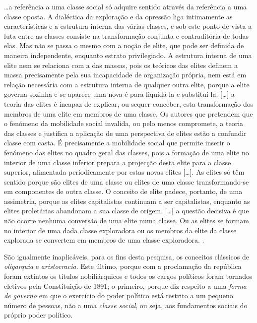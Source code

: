 \begin{citacao}
\dots a referência a uma classe social só adquire sentido através da referência a uma classe oposta. A dialéctica da exploração e da opressão liga intimamente as características e a estrutura interna das várias classes, e sob este ponto de vista a luta entre as classes consiste na transformação conjunta e contraditória de todas elas. Mas não se passa o mesmo com a noção de elite, que pode ser definida de maneira independente, enquanto estrato privilegiado. A estrutura interna de uma elite nem se relaciona com a das massas, pois os teóricos das elites definem a massa precisamente pela sua incapacidade de organização própria, nem está em relação necessária com a estrutura interna de qualquer outra elite, porque a elite governa sozinha e se aparece uma nova é para liquidá-la e substituí-la. [\dots] a teoria das elites é incapaz de explicar, ou sequer conceber, esta transformação dos membros de uma elite em membros de uma classe. Os autores que pretendem que o fenómeno da mobilidade social invalida, ou pelo menos compromete, a teoria das classes e justifica a aplicação de uma perspectiva de elites estão a confundir classe com casta. É precisamente a mobilidade social que permite inserir o fenómeno das elites no quadro geral das classes, pois a formação de uma elite no interior de uma classe inferior prepara a projecção desta elite para a classe superior, alimentada periodicamente por estas novas elites [\dots]. As elites só têm sentido porque são elites de uma classe ou elites de uma classe transformando-se em componentes de outra classe. O conceito de elite padece, portanto, de uma assimetria, porque as elites capitalistas continuam a ser capitalistas, enquanto as elites proletárias abandonam a sua classe de origem. [\dots] a questão decisiva é que não ocorre nenhuma conversão de uma elite numa classe. Ou as elites se formam no interior de uma dada classe exploradora ou os membros da elite da classe explorada se convertem em membros de uma classe exploradora. \cite[p.~387-388]{bernardo_fascismo_2015}.
\end{citacao}

São igualmente inaplicáveis, para os fins desta pesquisa, os conceitos clássicos de \textit{oligarquia} e \textit{aristocracia}. Este último, porque com a proclamação da república foram extintos os títulos nobiliárquicos e todos os cargos políticos foram tornados eletivos pela Constituição de 1891; o primeiro, porque diz respeito a uma \textit{forma de governo} em que o exercício do poder político está restrito a um pequeno número de pessoas, não a uma \textit{classe social}, ou seja, aos fundamentos sociais do próprio poder político.

